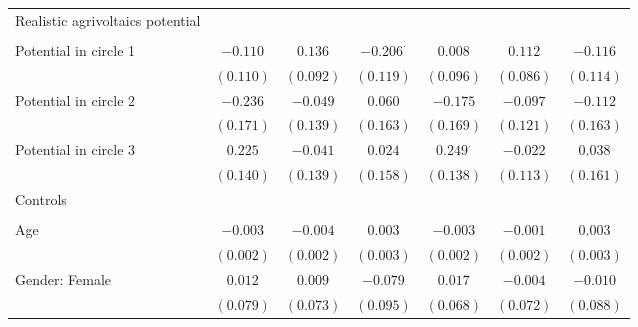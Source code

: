 \begin{center}
\begin{small}
\begin{longtable}{l@{} c@{} c@{} c@{} c@{} c@{} c@{}}
Realistic agrivoltaics potential    &                  &               &                  &                 &               &                  \\
                                    &                  &               &                  &                 &               &                  \\
\quad Potential in circle 1         & $-0.110$         & $0.136$       & $-0.206^{\cdot}$ & $0.008$         & $0.112$       & $-0.116$         \\
                                    & $(0.110)$        & $(0.092)$     & $(0.119)$        & $(0.096)$       & $(0.086)$     & $(0.114)$        \\
\quad Potential in circle 2         & $-0.236$         & $-0.049$      & $0.060$          & $-0.175$        & $-0.097$      & $-0.112$         \\
                                    & $(0.171)$        & $(0.139)$     & $(0.163)$        & $(0.169)$       & $(0.121)$     & $(0.163)$        \\
\quad Potential in circle 3         & $0.225$          & $-0.041$      & $0.024$          & $0.249^{\cdot}$ & $-0.022$      & $0.038$          \\
                                    & $(0.140)$        & $(0.139)$     & $(0.158)$        & $(0.138)$       & $(0.113)$     & $(0.161)$        \\
Controls                            &                  &               &                  &                 &               &                  \\
                                    &                  &               &                  &                 &               &                  \\
\quad Age                           & $-0.003$         & $-0.004$      & $0.003$          & $-0.003$        & $-0.001$      & $0.003$          \\
                                    & $(0.002)$        & $(0.002)$     & $(0.003)$        & $(0.002)$       & $(0.002)$     & $(0.003)$        \\
\quad Gender: Female                & $0.012$          & $0.009$       & $-0.079$         & $0.017$         & $-0.004$      & $-0.010$         \\
                                    & $(0.079)$        & $(0.073)$     & $(0.095)$        & $(0.068)$       & $(0.072)$     & $(0.088)$        \\

\end{longtable}
\end{small}
\end{center}
